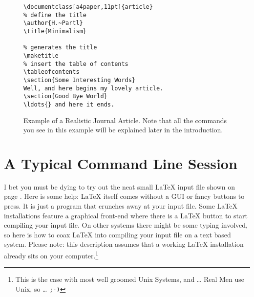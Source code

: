 \begin{figure}[!bp]
\begin{lined}{10cm}
\begin{verbatim}
\documentclass[a4paper,11pt]{article}
% define the title
\author{H.~Partl}
\title{Minimalism}

% generates the title
\maketitle 
% insert the table of contents
\tableofcontents
\section{Some Interesting Words}
Well, and here begins my lovely article.
\section{Good Bye World}
\ldots{} and here it ends.

\end{verbatim}
\end{lined}
\caption[Example of a Realistic Journal Article.]{Example of a Realistic
Journal Article. Note that all the commands you see in this example will be
explained later in the introduction.} \label{document}

\end{figure}

\section{A Typical Command Line Session}

I bet you must be dying to try out the neat small \LaTeX{} input file
shown on page \pageref{mini}. Here is some help:
\LaTeX{} itself comes without a GUI or
fancy buttons to press. It is just a program that crunches away at your
input file. Some \LaTeX{} installations feature a graphical front-end where
there is a \LaTeX{} button to start compiling your input file. On other systems
there might be some typing involved, so here is how to coax \LaTeX{} into
compiling your input file on a text based system. Please note: this
description assumes that a working \LaTeX{} installation already sits on
your computer.\footnote{This is the case with most well groomed Unix
Systems, and \ldots{} Real Men use Unix, so \ldots{} \texttt{;-)}}

